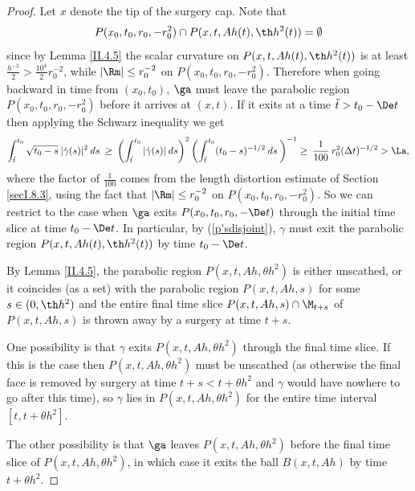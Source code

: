 \begin{proof}
Let $x$ denote the tip of the surgery cap.
Note that
\begin{equation}
\label{p'sdisjoint}
P(x_0,t_0,r_0,-r_0^2)\cap P(x,t,Ah(t),\th h^2(t))=\emptyset
\end{equation}
since by Lemma \ref{II.4.5} the scalar curvature on
$P(x,t,Ah(t),\th h^2(t))$ is at least
$\frac{h^{-2}}{2}>\frac{10^4}{2}r_0^{-2}$, while $|\Rm|\leq r_0^{-2}$
on $P(x_0,t_0,r_0,-r_0^2)$.  Therefore when going backward in time
from $(x_0,t_0)$, $\ga$ must leave the parabolic region
$P(x_0,t_0,r_0,-r_0^2)$
before it arrives at $(x,t)$.
If it exits at a time $\tilde t > t_0-\De t$ then
applying the Schwarz inequality we get
\begin{equation}
\int_{\tilde{t}}^{t_0} \sqrt{t_0 - s} \:
|\dot{\gamma}(s)|^2 \: ds \: \ge \:
\left( \int_{\tilde{t}}^{t_0}
|\dot{\gamma}(s)| \: ds \right)^2
\left( \int_{\tilde{t}}^{t_0} (t_0 - s)^{-1/2}
\: ds \:\right)^{-1}
\ge \: \frac{1}{100} \: r_0^2 (\Delta t)^{-1/2}>\La,
\end{equation}
where the factor of $\frac{1}{100}$ comes from
the length distortion estimate
of Section \ref{secI.8.3},
using the fact that $|\Rm| \le r_0^{-2}$ on $P(x_0, t_0, r_0, -r_0^2)$.
So we can restrict to the case when $\ga$ exits
$P(x_0,t_0,r_0,-\De t)$ through the
initial time slice  at time $t_0-\De t$. In particular,
by (\ref{p'sdisjoint}),
$\gamma$ must exit the parabolic region $P(x,t,Ah(t),\th h^2(t))$
by time $t_0-\De t$.

By Lemma \ref{II.4.5}, the parabolic region $P(x,t,Ah,\theta h^2)$ is
either unscathed, or it coincides (as a set) with the parabolic
region $P(x,t,Ah,s)$ for some $s\in (0,\th h^2)$ and the entire
final time slice $P(x,t,Ah,s)\cap \M_{t+s}$
of $P(x,t,Ah,s)$ is thrown away by a surgery
at time $t+s$.

One possibility is that  $\gamma$ exits $P(x,t,Ah,\theta h^2)$
through the final time slice. If this is the case then $P(x,t,Ah,\theta h^2)$
must be unscathed (as otherwise the final face is removed by surgery at
time $t+s < t+\theta h^2$ and $\gamma$ would have nowhere to go after this time), so
$\gamma$ lies in $P(x,t,Ah,\theta h^2)$ for the entire time interval
$[t, t+\theta h^2]$.

The other possibility is that $\ga$ leaves $P(x,t,Ah,\theta h^2)$ before the
final time slice of $P(x,t,Ah, \theta h^2)$, in which case it exits
the ball $B(x,t,Ah)$ by time $t + \theta h^2$.


\end{proof}

